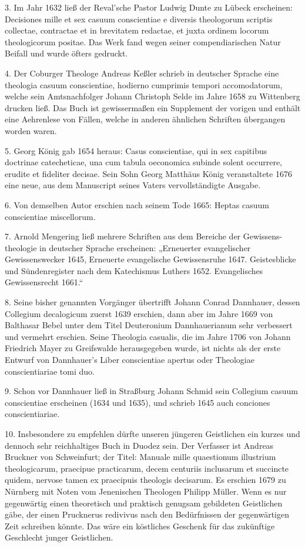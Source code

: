 3. Im Jahr 1632 ließ der Reval'sche Pastor Ludwig Dunte zu Lübeck erscheinen: Decisiones mille et sex casuum conscientiae e diversis theologorum scriptis collectae, contractae et in brevitatem redactae, et juxta ordinem locorum theologicorum positae. Das Werk fand wegen seiner compendiarischen Natur Beifall und wurde öfters gedruckt.

4. Der Coburger Theologe Andreas Keßler schrieb in deutscher Sprache eine theologia casuum conscientiae, hodierno cumprimis tempori accomodatorum, welche sein Amtsnachfolger Johann Christoph Selde im Jahre 1658 zu Wittenberg drucken ließ. Das Buch ist gewissermaßen ein Supplement der vorigen und enthält eine Aehrenlese von Fällen, welche in anderen ähnlichen Schriften übergangen worden waren.

5. Georg König gab 1654 heraus: Casus conscientiae, qui in sex capitibus doctrinae catecheticae, una cum tabula oeconomica subinde solent occurrere, erudite et fideliter decisae. Sein Sohn Georg Matthäus König veranstaltete 1676 eine neue, aus dem Manuscript seines Vaters vervollständigte Ausgabe.

6. Von demselben Autor erschien nach seinem Tode 1665: Heptas casuum conscientiae miscellorum.

7. Arnold Mengering ließ mehrere Schriften aus dem Bereiche der Gewissens-theologie in deutscher Sprache erscheinen: „Erneuerter evangelischer Gewissenswecker 1645, Erneuerte evangelische Gewissensruhe 1647. Geistesblicke und Sündenregister nach dem Katechismus Luthers 1652. Evangelisches Gewissensrecht 1661.“

8. Seine bisher genannten Vorgänger übertrifft Johann Conrad Dannhauer, dessen Collegium decalogicum zuerst 1639 erschien, dann aber im Jahre 1669 von Balthasar Bebel unter dem Titel Deuteronium Dannhauerianum sehr verbessert und vermehrt erschien. Seine Theologia casualis, die im Jahre 1706 von Johann Friedrich Mayer zu Greifswalde herausgegeben wurde, ist nichts als der erste Entwurf von Dannhauer’s Liber conscientiae apertus oder Theologiae conscientiariae tomi duo.

9. Schon vor Dannhauer ließ in Straßburg Johann Schmid sein Collegium casuum conscientiae erscheinen (1634 und 1635), und schrieb 1645 auch conciones conscientiariae.

10. Insbesondere zu empfehlen dürfte unseren jüngeren Geistlichen ein kurzes und dennoch sehr reichhaltiges Buch in Duodez sein. Der Verfasser ist Andreas Bruckner von Schweinfurt; der Titel: Manuale mille quaestionum illustrium theologicarum, praecipue practicarum, decem centuriis inclusarum et succincte quidem, nervose tamen ex praecipuis theologis decisarum. Es erschien 1679 zu Nürnberg mit Noten vom Jenenischen Theologen Philipp Müller. Wenn es nur gegenwärtig einen theoretisch und praktisch genugsam gebildeten Geistlichen gäbe, der einen Prucknerus redivivus nach den Bedürfnissen der gegenwärtigen Zeit schreiben könnte. Das wäre ein köstliches Geschenk für das zukünftige Geschlecht junger Geistlichen.

